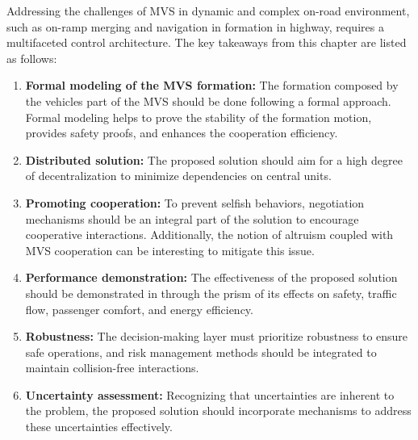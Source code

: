 Addressing the challenges of MVS in dynamic and complex on-road environment, such as on-ramp merging and navigation in formation in highway, requires a multifaceted control architecture. The key takeaways from this chapter are listed as follows: 









\begin{enumerate}

    \item \textbf{Formal modeling of the MVS formation:} The formation composed by the vehicles part of the MVS should be done following a formal approach. Formal modeling helps to prove the stability of the formation motion, provides safety proofs, and enhances the cooperation efficiency. 

    \item \textbf{Distributed solution:} The proposed solution should aim for a high degree of decentralization to minimize dependencies on central units.

     \item \textbf{Promoting cooperation:} To prevent selfish behaviors, negotiation mechanisms should be an integral part of the solution to encourage cooperative interactions. Additionally, the notion of altruism coupled with MVS cooperation can be interesting to mitigate this issue. 

    
     \item \textbf{Performance demonstration:} The effectiveness of the proposed solution should be demonstrated in through the prism of its effects on safety, traffic flow, passenger comfort, and energy efficiency. 

    \item \textbf{Robustness:} The decision-making layer must prioritize robustness to ensure safe operations, and risk management methods should be integrated to maintain collision-free interactions.

     \item \textbf{Uncertainty assessment:} Recognizing that uncertainties are inherent to the problem, the proposed solution should incorporate mechanisms to address these uncertainties effectively.


\end{enumerate}


